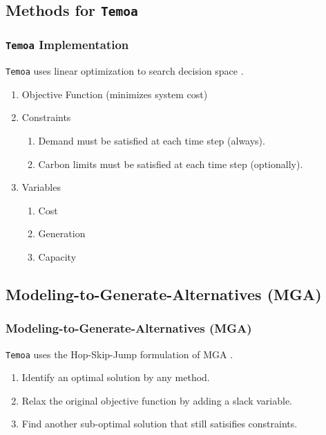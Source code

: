 \subsection{Methods for \texttt{Temoa}}
\begin{frame}
  \frametitle{\texttt{Temoa} Implementation}
  \texttt{Temoa} uses linear optimization to search decision space \cite{hunter_modeling_2013}.
  \begin{enumerate}
    \item Objective Function (minimizes system cost)
    \item Constraints
    \begin{enumerate}
      \item Demand must be satisfied at each time step (always).
      \item Carbon limits must be satisfied at each time step (optionally).
    \end{enumerate}
    \item Variables
    \begin{enumerate}
      \item Cost
      \item Generation
      \item Capacity
    \end{enumerate}
  \end{enumerate}
\end{frame}

\subsection{Modeling-to-Generate-Alternatives (MGA)}
\begin{frame}
  \frametitle{Modeling-to-Generate-Alternatives (MGA)}
  \texttt{Temoa} uses the Hop-Skip-Jump formulation of MGA \cite{brill_modeling_1982}.
  \begin{enumerate}
    \item Identify an optimal solution by any method.
    \item Relax the original objective function by adding a slack variable.
    \item Find another sub-optimal solution that still satisifies constraints.
  \end{enumerate}
\end{frame}

